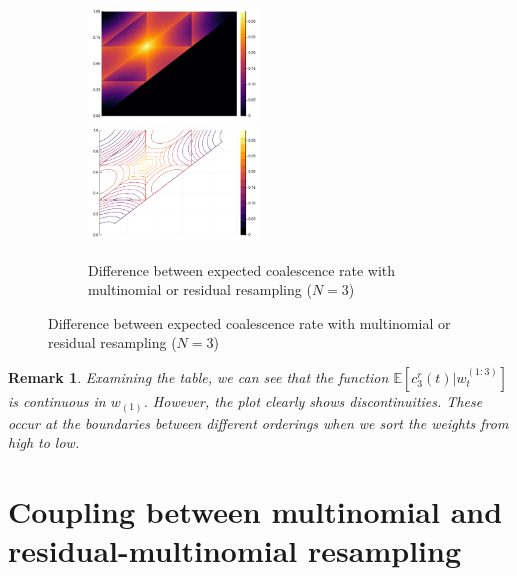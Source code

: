 \documentclass{article}
\newtheorem{remark}{Remark}
\newcommand{\E}{\mathbb{E}}
\newcommand{\1}[1]{\mathbbm{1}_{#1}}
\begin{document}
\begin{figure}
\begin{subfigure}{\textwidth}
		\includegraphics[width=0.5\textwidth]{plots/EcN_mn_res_diff_N3_heatmap.pdf}
		\includegraphics[width=0.5\textwidth]{plots/EcN_mn_res_diff_N3_contour.pdf}
	\caption{Difference between expected coalescence rate with multinomial or residual resampling ($N=3$)}
	\end{subfigure}
\end{figure}

\begin{remark}
Examining the table, we can see that the function $\E[c_3^r(t) |w_t^{(1:3)}]$ is continuous in $w_{(1)}$. However, the plot clearly shows discontinuities. These occur at the boundaries between different orderings when we sort the weights from high to low.
\end{remark}







\section{Coupling between multinomial and residual-multinomial resampling}
\end{document}
